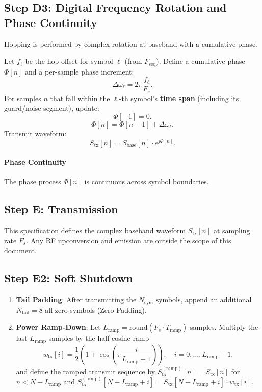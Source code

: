 \documentclass[11pt]{article}
\begin{document}
\subsection{Step D3: Digital Frequency Rotation and Phase Continuity}

Hopping is performed by complex rotation at baseband with a cumulative phase.

Let $f_\ell$ be the hop offset for symbol $\ell$ (from $F_{\text{seq}}$). Define a cumulative phase $\Phi[n]$ and a per-sample phase increment:
\[
  \Delta\omega_\ell = 2\pi\frac{f_\ell}{F_s}.
\]
For samples $n$ that fall within the $\ell$-th symbol's \textbf{time span} (including its guard/noise segment), update:
\[
  \Phi[-1]=0.
\]
\[
  \Phi[n] = \Phi[n-1] + \Delta\omega_\ell.
\]
Transmit waveform:
\[
  S_{\text{tx}}[n] = S_{\text{base}}[n]\cdot e^{j\Phi[n]}.
\]
\paragraph{Phase Continuity}
The phase process $\Phi[n]$ is continuous across symbol boundaries.

\subsection{Step E: Transmission}

This specification defines the complex baseband waveform $S_{\text{tx}}[n]$ at sampling rate $F_s$. Any RF upconversion and emission are outside the scope of this document.

\subsection{Step E2: Soft Shutdown}

\begin{enumerate}
\item \textbf{Tail Padding}: After transmitting the $N_{\text{sym}}$ symbols, append an additional $N_{\text{tail}}=8$ all-zero symbols (Zero Padding).
\item \textbf{Power Ramp-Down}: Let $L_{\text{ramp}}=\mathrm{round}(F_s\cdot T_{\text{ramp}})$ samples. Multiply the last $L_{\text{ramp}}$ samples by the half-cosine ramp
  \[
    w_{\text{tx}}[i]=\frac{1}{2}\left(1+\cos\left(\pi\frac{i}{L_{\text{ramp}}-1}\right)\right),\quad i=0,\dots,L_{\text{ramp}}-1,
  \]
  and define the ramped transmit sequence by $S_{\text{tx}}^{(\text{ramp})}[n]=S_{\text{tx}}[n]$ for $n<N-L_{\text{ramp}}$ and $S_{\text{tx}}^{(\text{ramp})}[N-L_{\text{ramp}}+i]=S_{\text{tx}}[N-L_{\text{ramp}}+i]\cdot w_{\text{tx}}[i]$.
\end{enumerate}
\end{document}
